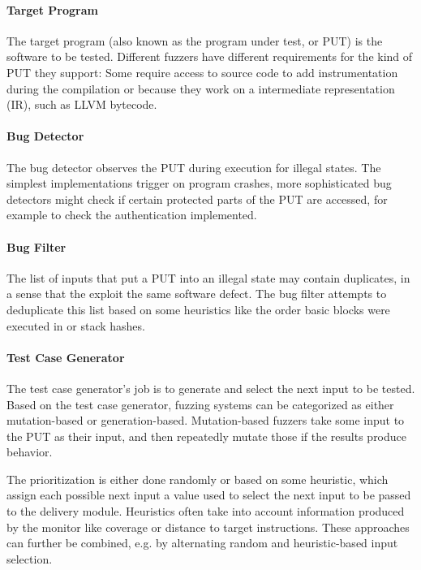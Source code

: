 \documentclass{article}
\begin{document}
\begin{multicols}{2}
    \paragraph{Target Program}
    The target program (also known as the program under test, or PUT) is the software to be tested. Different fuzzers have different requirements for the kind of PUT they support: Some require access to source code to add instrumentation during the compilation or because they work on a intermediate representation (IR), such as LLVM bytecode.

    \paragraph{Bug Detector}
    The bug detector observes the PUT during execution for illegal states. The simplest implementations trigger on program crashes, more sophisticated bug detectors might check if certain protected parts of the PUT are accessed, for example to check the authentication implemented.

    \paragraph{Bug Filter}
    The list of inputs that put a PUT into an illegal state may contain duplicates, in a sense that the exploit the same software defect. The bug filter attempts to deduplicate this list based on some heuristics like the order basic blocks were executed in or stack hashes.

    \paragraph{Test Case Generator}
    The test case generator's job is to generate and select the next input to be tested. Based on the test case generator, fuzzing systems can be categorized as either mutation-based or generation-based. Mutation-based fuzzers take some input to the PUT as their input, and then repeatedly mutate those if the results produce  behavior\cite{EvaluatingFuzzTesting}.

    The prioritization is either done randomly or based on some heuristic, which assign each possible next input a value used to select the next input to be passed to the delivery module. Heuristics often take into account information produced by the monitor like coverage or distance to target instructions. These approaches can further be combined, e.g. by alternating random and heuristic-based input selection.


\end{multicols}
\end{document}
